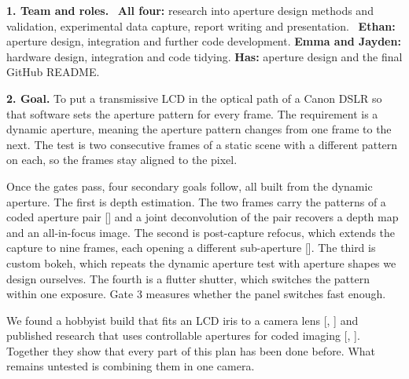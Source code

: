 \vspace{0.5em}
\noindent\textbf{1. Team and roles.} \
\textbf{All four:} research into aperture design methods and validation, experimental data capture, report writing and presentation. \
\textbf{Ethan:} aperture design, integration and further code development. \textbf{Emma and Jayden:} hardware design, integration and code tidying. \textbf{Has:} aperture design and the final GitHub README.

\vspace{0.4em}
\noindent\textbf{2. Goal.}
 \noindent To put a transmissive LCD in the optical path of a Canon DSLR so that software sets the aperture pattern for every frame. The requirement is a dynamic aperture, meaning the aperture pattern changes from one frame to the next. The test is two consecutive frames of a static scene with a different pattern on each, so the frames stay aligned to the pixel.

\vspace{\baselineskip}
 \noindent Once the gates pass, four secondary goals follow, all built from the dynamic aperture. The first is depth estimation. The two frames carry the patterns of a coded aperture pair [] and a joint deconvolution of the pair recovers a depth map and an all-in-focus image. The second is post-capture refocus, which extends the capture to nine frames, each opening a different sub-aperture []. The third is custom bokeh, which repeats the dynamic aperture test with aperture shapes we design ourselves. The fourth is a flutter shutter, which switches the pattern within one exposure. Gate 3 measures whether the panel switches fast enough.

\vspace{\baselineskip}
 \noindent We found a hobbyist build that fits an LCD iris to a camera lens [, ] and published research that uses controllable apertures for coded imaging [, ]. Together they show that every part of this plan has been done before. What remains untested is combining them in one camera.


